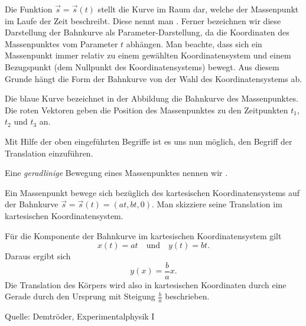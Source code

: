 \begin{MContent}
Die Funktion $\vec{s}=\vec{s}(t)$ stellt die Kurve im Raum dar, welche der Massenpunkt im Laufe der Zeit beschreibt. Diese nennt man . Ferner bezeichnen wir diese Darstellung der Bahnkurve als Parameter-Darstellung, da die Koordinaten des Massenpunktes vom Parameter $t$ abh\"angen. Man beachte, dass sich ein Massenpunkt immer relativ zu einem gew\"ahlten Koordinatensystem und einem Bezugspunkt (dem Nullpunkt des Koordinatensystems) bewegt. Aus diesem Grunde h\"angt die Form der Bahnkurve von der Wahl des Koordinatensystems ab. 
 


Die blaue Kurve bezeichnet in der Abbildung die Bahnkurve des Massenpunktes. Die roten Vektoren geben die Position des Massenpunktes zu den Zeitpunkten $t_1$, $t_2$ und $t_3$ an.

Mit Hilfe der oben eingef\"uhrten Begriffe ist es uns nun m\"oglich, den Begriff der Translation einzuf\"uhren.

\begin{MInfo}
Eine \textit{geradlinige} Bewegung eines Massenpunktes nennen wir .
\end{MInfo}

\begin{MExercise}
Ein Massenpunkt bewege sich bez\"uglich des kartesischen Koordinatensystems auf der Bahnkurve $\vec{s}=\vec{s}(t)=(a t,b t,0)$. Man skizziere seine Translation im kartesischen Koordinatensystem.

\begin{MSolution} F\"ur die Komponente der Bahnkurve im kartesischen Koordinatensystem gilt 
$$
x(t)=a t \quad\text{und}\quad y(t)=b t.
$$ Daraus ergibt sich
$$
y(x)=\frac{b}{a}x.
$$
Die Translation des K\"orpers wird also in kartesischen Koordinaten durch eine Gerade durch den Ursprung mit Steigung $\frac{b}{a}$ beschrieben.


\end{MSolution}


Quelle: Demtr\"oder, Experimentalphysik I
\end{MExercise}

\end{MContent}

